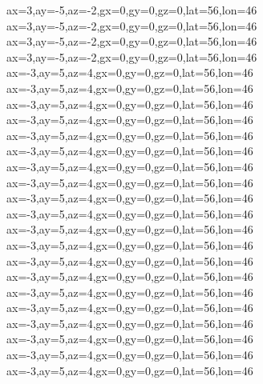 ax=3,ay=-5,az=-2,gx=0,gy=0,gz=0,lat=56,lon=46
ax=3,ay=-5,az=-2,gx=0,gy=0,gz=0,lat=56,lon=46
ax=3,ay=-5,az=-2,gx=0,gy=0,gz=0,lat=56,lon=46
ax=3,ay=-5,az=-2,gx=0,gy=0,gz=0,lat=56,lon=46
ax=-3,ay=5,az=4,gx=0,gy=0,gz=0,lat=56,lon=46
ax=-3,ay=5,az=4,gx=0,gy=0,gz=0,lat=56,lon=46
ax=-3,ay=5,az=4,gx=0,gy=0,gz=0,lat=56,lon=46
ax=-3,ay=5,az=4,gx=0,gy=0,gz=0,lat=56,lon=46
ax=-3,ay=5,az=4,gx=0,gy=0,gz=0,lat=56,lon=46
ax=-3,ay=5,az=4,gx=0,gy=0,gz=0,lat=56,lon=46
ax=-3,ay=5,az=4,gx=0,gy=0,gz=0,lat=56,lon=46
ax=-3,ay=5,az=4,gx=0,gy=0,gz=0,lat=56,lon=46
ax=-3,ay=5,az=4,gx=0,gy=0,gz=0,lat=56,lon=46
ax=-3,ay=5,az=4,gx=0,gy=0,gz=0,lat=56,lon=46
ax=-3,ay=5,az=4,gx=0,gy=0,gz=0,lat=56,lon=46
ax=-3,ay=5,az=4,gx=0,gy=0,gz=0,lat=56,lon=46
ax=-3,ay=5,az=4,gx=0,gy=0,gz=0,lat=56,lon=46
ax=-3,ay=5,az=4,gx=0,gy=0,gz=0,lat=56,lon=46
ax=-3,ay=5,az=4,gx=0,gy=0,gz=0,lat=56,lon=46
ax=-3,ay=5,az=4,gx=0,gy=0,gz=0,lat=56,lon=46
ax=-3,ay=5,az=4,gx=0,gy=0,gz=0,lat=56,lon=46
ax=-3,ay=5,az=4,gx=0,gy=0,gz=0,lat=56,lon=46
ax=-3,ay=5,az=4,gx=0,gy=0,gz=0,lat=56,lon=46
ax=-3,ay=5,az=4,gx=0,gy=0,gz=0,lat=56,lon=46